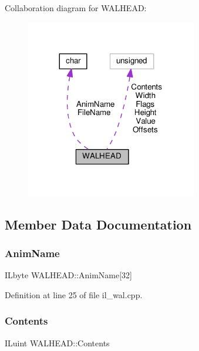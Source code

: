 Collaboration diagram for W\+A\+L\+H\+E\+AD\+:
\nopagebreak
\begin{figure}[H]
\begin{center}
\leavevmode
\includegraphics[width=212pt]{d4/d93/structWALHEAD__coll__graph}
\end{center}
\end{figure}


\subsection{Member Data Documentation}
\mbox{\label{structWALHEAD_a203bd236a4ddbdc2e5381efd50190938}} 
\subsubsection{\texorpdfstring{Anim\+Name}{AnimName}}
{\footnotesize\ttfamily I\+Lbyte W\+A\+L\+H\+E\+A\+D\+::\+Anim\+Name\mbox{[}32\mbox{]}}



Definition at line 25 of file il\+\_\+wal.\+cpp.

\mbox{\label{structWALHEAD_a68cc0f01b1613f1be5b2f43ebf9564a8}} 
\subsubsection{\texorpdfstring{Contents}{Contents}}
{\footnotesize\ttfamily I\+Luint W\+A\+L\+H\+E\+A\+D\+::\+Contents}



